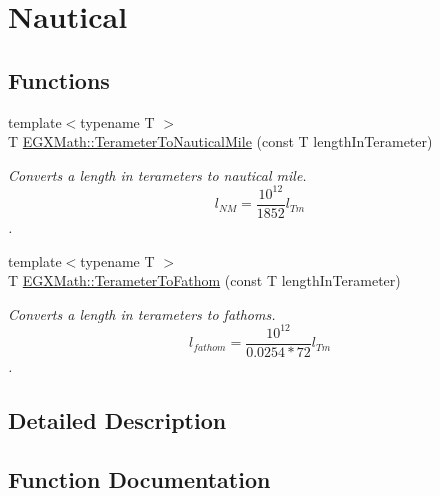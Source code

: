 \hypertarget{group___e_g_x_math-_conversions-_length_conversions-_s_i-_terameter-_nautical}{}\section{Nautical}
\label{group___e_g_x_math-_conversions-_length_conversions-_s_i-_terameter-_nautical}
\subsection*{Functions}
\begin{DoxyCompactItemize}
\item 
{\footnotesize template$<$typename T $>$ }\\T \mbox{\hyperlink{group___e_g_x_math-_conversions-_length_conversions-_s_i-_terameter-_nautical_ga6a799ea329334a189c2ed5a898a238af}{E\+G\+X\+Math\+::\+Terameter\+To\+Nautical\+Mile}} (const T length\+In\+Terameter)
\begin{DoxyCompactList}\small\item\em Converts a length in terameters to nautical mile. \[ l_{NM}= \frac{10^{12}}{1852} l_{Tm} \]. \end{DoxyCompactList}\item 
{\footnotesize template$<$typename T $>$ }\\T \mbox{\hyperlink{group___e_g_x_math-_conversions-_length_conversions-_s_i-_terameter-_nautical_gaef70a960ef5e91001f3ff2bfeb0d96bf}{E\+G\+X\+Math\+::\+Terameter\+To\+Fathom}} (const T length\+In\+Terameter)
\begin{DoxyCompactList}\small\item\em Converts a length in terameters to fathoms. \[ l_{fathom}= \frac{10^{12}}{0.0254 * 72} l_{Tm} \]. \end{DoxyCompactList}\end{DoxyCompactItemize}


\subsection{Detailed Description}


\subsection{Function Documentation}
\mbox{\label{group___e_g_x_math-_conversions-_length_conversions-_s_i-_terameter-_nautical_gaef70a960ef5e91001f3ff2bfeb0d96bf}} 
